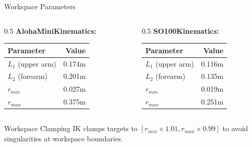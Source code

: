 \begin{frame}{Workspace Parameters}
\begin{columns}
\begin{column}{0.5\textwidth}
    \textbf{AlohaMiniKinematics:}
    \begin{table}
    \centering
    \footnotesize
    \begin{tabular}{lr}
    \toprule
    \textbf{Parameter} & \textbf{Value} \\
    \midrule
    $L_1$ (upper arm) & 0.174m \\
    $L_2$ (forearm) & 0.201m \\
    $r_{min}$ & 0.027m \\
    $r_{max}$ & 0.375m \\
    \bottomrule
    \end{tabular}
    \end{table}
\end{column}
\begin{column}{0.5\textwidth}
    \textbf{SO100Kinematics:}
    \begin{table}
    \centering
    \footnotesize
    \begin{tabular}{lr}
    \toprule
    \textbf{Parameter} & \textbf{Value} \\
    \midrule
    $L_1$ (upper arm) & 0.116m \\
    $L_2$ (forearm) & 0.135m \\
    $r_{min}$ & 0.019m \\
    $r_{max}$ & 0.251m \\
    \bottomrule
    \end{tabular}
    \end{table}
\end{column}
\end{columns}

\vspace{0.5cm}

\begin{block}{Workspace Clamping}
IK clamps targets to $[r_{min} \times 1.01, r_{max} \times 0.99]$ to avoid singularities at workspace boundaries.
\end{block}
\end{frame}

